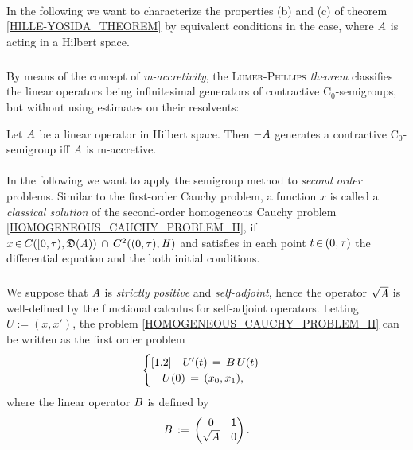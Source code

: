 \documentclass[11pt,twoside]{article}
\begin{document}
\paragraph{} %
In the following we want to characterize the properties (b) and (c)
of theorem \ref{HILLE-YOSIDA_THEOREM} by equivalent conditions in the case,
where $\mathit{A}$ is acting in a Hilbert space.

\subparagraph{}
By means of the concept of \textit{m-accretivity},
the \textsc{Lumer-Phillips} \textit{theorem}
classifies the linear operators
being infinitesimal generators of contractive C$_0$-semigroups,
but without using estimates on their resolvents:

\begin{theorem1}\label{LUMER-PHILLIPS_THEOREM}
Let $\mathit{A}$ be a linear operator in Hilbert space.
Then ${-}\mathit{A}$ generates a contractive C$_0$-semigroup
iff $\mathit{A}$ is m-accretive.
\end{theorem1}

\paragraph{} %
In the following we want to apply the semigroup method
to \textit{second order} problems.
Similar to the first-order Cauchy problem,
a function $x$ is called
a \textit{classical solution} of the second-order homogeneous Cauchy problem
\eqref{HOMOGENEOUS_CAUCHY_PROBLEM_II},
if $x {\,\in\,} C([0,\tau),\mathfrak{D}(\mathit{A})) \, \cap \, C^2((0,\tau),\mathit{H})$
and satisfies in each point $t {\,\in\,} (0,\tau)$ the differential equation
and the both initial conditions.

\subparagraph{}
We suppose that $\mathit{A}$ is \textit{strictly positive} and \textit{self-adjoint},
hence the operator $\sqrt{\mathit{A}}$ is well-defined
by the functional calculus for self-adjoint operators.
Letting $U := (x,x')$,
the problem \eqref{HOMOGENEOUS_CAUCHY_PROBLEM_II} can be written
as the first order problem
\[
\begin{cases}[1.2]
\quad U'(t) \,=\, {B} \, U(t) \\
\quad U(0)  \,=\, (x_0,x_1),\\
\end{cases}
\]
where the linear operator ${B}$ is defined by
\[
{B} \,:=\, \begin{pmatrix} 0 & {\mathsf{1}} \\ \sqrt{\mathit{A}} & 0 \end{pmatrix}.
\]
\end{document}
